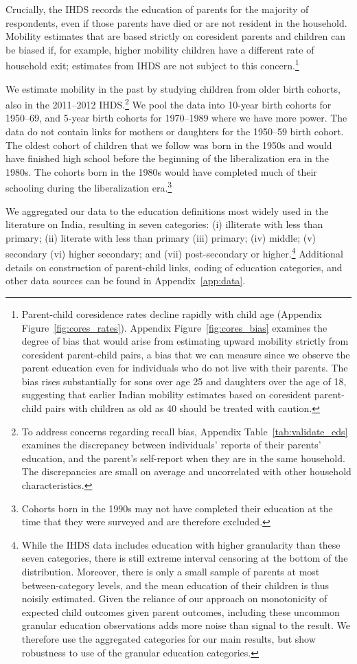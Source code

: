 \documentclass[12pt,letterpaper]{article}
\numberwithin{equation}{section}
\begin{document}
Crucially, the IHDS records the education of parents for the majority of respondents, even if those parents have died or are not resident in the household. Mobility estimates that are based strictly on coresident parents and children can be biased if, for example, higher mobility children have a different rate of household exit; estimates from IHDS are not subject to this concern.\footnote{Parent-child coresidence rates decline rapidly with child age (Appendix Figure~\ref{fig:cores_rates}). Appendix Figure~\ref{fig:cores_bias} examines the degree of bias that would arise from estimating upward mobility strictly from coresident parent-child pairs, a bias that we can measure since we observe the parent education even for individuals who do not live with their parents. The bias rises substantially for sons over age 25 and daughters over the age of 18, suggesting that earlier Indian mobility estimates based on coresident parent-child pairs with children as old as 40 should be treated with caution.}

We estimate mobility in the past by studying children from older birth cohorts, also in the 2011--2012 IHDS.\footnote{To address concerns regarding recall bias, Appendix Table~\ref{tab:validate_eds} examines the discrepancy between individuals' reports of their parents' education, and the parent's self-report when they are in the same household. The discrepancies are small on average and uncorrelated with other household characteristics.}  We pool the data into 10-year birth cohorts for 1950--69, and 5-year birth cohorts for 1970--1989 where we have more power. The data do not contain links for mothers or daughters for the 1950--59 birth cohort. The oldest cohort of children that we follow was born in the 1950s and would have finished high school before the beginning of the liberalization era in the 1980s. The cohorts born in the 1980s would have completed much of their schooling during the liberalization era.\footnote{Cohorts born in the 1990s may not have completed their education at the time that they were surveyed and are therefore excluded.}

We aggregated our data to the education definitions most widely used in the literature on India, resulting in seven categories: (i) illiterate with less than primary; (ii) literate with less than primary (iii) primary; (iv) middle; (v) secondary (vi) higher secondary; and (vii) post-secondary or higher.\footnote{While the IHDS data includes education with higher granularity than these seven categories, there is still extreme interval censoring at the bottom of the distribution. Moreover, there is only a small sample of parents at most between-category levels, and the mean education of their children is thus noisily estimated. Given the reliance of our approach on monotonicity of expected child outcomes given parent outcomes, including these uncommon granular education observations adds more noise than signal to the result. We therefore use the aggregated categories for our main results, but show robustness to use of the granular education categories.} Additional details on construction of parent-child links, coding of education categories, and other data sources can be found in Appendix~\ref{app:data}.
\end{document}
